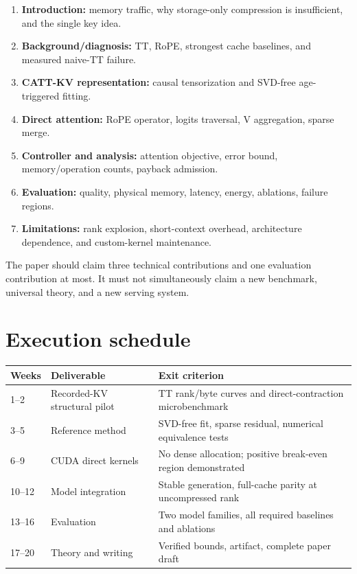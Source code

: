 \documentclass[11pt]{article}
\begin{document}
\begin{enumerate}[leftmargin=1.55em,itemsep=3pt]
\item \textbf{Introduction:} memory traffic, why storage-only compression is insufficient, and the
single key idea.
\item \textbf{Background/diagnosis:} TT, RoPE, strongest cache baselines, and measured naive-TT
failure.
\item \textbf{CATT-KV representation:} causal tensorization and SVD-free age-triggered fitting.
\item \textbf{Direct attention:} RoPE operator, logits traversal, V aggregation, sparse merge.
\item \textbf{Controller and analysis:} attention objective, error bound, memory/operation counts,
payback admission.
\item \textbf{Evaluation:} quality, physical memory, latency, energy, ablations, failure regions.
\item \textbf{Limitations:} rank explosion, short-context overhead, architecture dependence, and
custom-kernel maintenance.
\end{enumerate}

The paper should claim three technical contributions and one evaluation contribution at most. It
must not simultaneously claim a new benchmark, universal theory, and a new serving system.

\section{Execution schedule}

\begin{center}
\small
\renewcommand{\arraystretch}{1.2}
\begin{tabularx}{\textwidth}{@{}p{1.6cm}p{3.0cm}X@{}}
\toprule
\textbf{Weeks} & \textbf{Deliverable} & \textbf{Exit criterion} \\
\midrule
1--2 & Recorded-KV structural pilot & TT rank/byte curves and direct-contraction microbenchmark \\
3--5 & Reference method & SVD-free fit, sparse residual, numerical equivalence tests \\
6--9 & CUDA direct kernels & No dense allocation; positive break-even region demonstrated \\
10--12 & Model integration & Stable generation, full-cache parity at uncompressed rank \\
13--16 & Evaluation & Two model families, all required baselines and ablations \\
17--20 & Theory and writing & Verified bounds, artifact, complete paper draft \\
\bottomrule
\end{tabularx}
\end{center}
\end{document}
